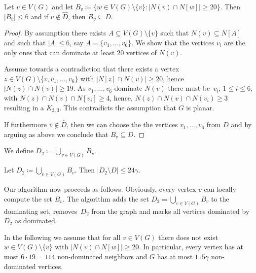 \documentclass[a4paper,UKenglish,cleveref, autoref, thm-restate]{lipics-v2021}
\begin{document}
\begin{lemma}\label{lem:small-intersections}
Let $v\in V(G)$ and let $B_v\coloneqq \{w\in V(G)\setminus \{v\}:
|N(v)\cap N[w]|\geq 20\}$. Then $|B_v|\leq 6$ and if $v\not\in \hat{D}$,
then $B_v\subseteq D$.
\end{lemma}
\begin{proof}
By assumption there exists $A\subseteq V(G)\setminus \{v\}$ such 
that $N(v)\subseteq N[A]$ and such that $|A|\leq 6$, say 
$A=\{v_1,\ldots, v_6\}$. We show that the vertices $v_i$ are the only ones 
that can dominate at least $20$ vertices of $N(v)$.

Assume towards a contradiction that there 
exists a vertex $z\in V(G)\setminus \{v,v_1,\ldots, v_6\}$ 
with $|N[z] \cap N(v)| \geq 20$,  hence $|N(z) \cap N(v)| \geq 19$. 
As $v_1, \ldots, v_6$ dominate $N(v)$ there must be~$v_i$, $1\leq i\leq 6$, with 
\mbox{$N(z) \cap N(v) \cap N[v_i] \geq 4$}, hence, 
\mbox{$N(z) \cap N(v) \cap N(v_i) \geq 3$} resulting in a $K_{3,3}$. 
This contradicts the assumption that $G$ is planar. 

%
%

If furthermore $v\not\in \hat{D}$, then we can choose the 
the vertices $v_1,\ldots, v_6$ from $D$ and by arguing as 
above we conclude that $B_v\subseteq D$. 
\end{proof}

We define $D_2\coloneqq \bigcup_{v\in V(G)} B_v$. 

\begin{corollary}
Let $D_2\coloneqq \bigcup_{v\in V(G)} B_v$. Then $|D_2\setminus D|\leq
24\gamma$.
\end{corollary}

Our algorithm now proceeds as follows. Obviously, every
vertex $v$ can locally compute the set $B_v$. The algorithm 
adds the set $D_2=\bigcup_{v\in V(G)} B_v$ to the dominating
set, removes~$D_2$ from the graph and marks all vertices dominated
by $D_2$ as dominated.


\begin{tcolorbox}
In the following we assume that for all $v\in V(G)$ there does not
exist $w\in V(G)\setminus\{v\}$ with $|N(v)\cap N[w]|\geq 20$.
In particular, every vertex has at most $6\cdot 19=114$ non-dominated 
neighbors and $G$ has at most $115\gamma$ non-dominated vertices.
\end{tcolorbox}
\end{document}
